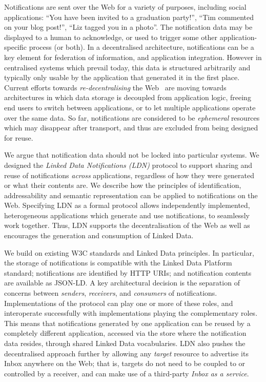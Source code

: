 \documentclass[a4paper]{llncs}
\begin{document}
\par Notifications are sent over the Web for a variety of purposes, including social applications: ``You have been invited to a graduation party!'', ``Tim commented on your blog post!'', ``Liz tagged you in a photo''. The notification data may be displayed to a human to acknowledge, or used to trigger some other application-specific process (or both). In a decentralised architecture, notifications can be a key element for federation of information, and application integration. However in centralised systems which prevail today, this data is structured arbitrarily and typically only usable by the application that generated it in the first place. Current efforts towards {\em re-decentralising} the Web~\cite{ref-1,ref-2,ref-3} are moving towards architectures in which data storage is decoupled from application logic, freeing end users to switch between applications, or to let multiple applications operate over the same data. So far, notifications are considered to be {\em ephemeral} resources which may disappear after transport, and thus are excluded from being designed for reuse.


\par We argue that notification data should not be locked into particular systems. We designed the {\em Linked Data Notifications (LDN)} protocol to support sharing and reuse of notifications {\em across} applications, regardless of how they were generated or what their contents are. We describe how the principles of identification, addressability and semantic representation can be applied to notifications on the Web. Specifying LDN as a formal protocol allows independently implemented, heterogeneous applications which generate and use notifications, to seamlessly work together. Thus, LDN supports the decentralisation of the Web as well as encourages the generation and consumption of Linked Data.


\par We build on existing W3C standards and Linked Data principles. In particular, the storage of notifications is compatible with the Linked Data Platform standard; notifications are identified by HTTP URIs; and notification contents are available as JSON-LD. A key architectural decision is the separation of concerns between {\em senders}, {\em receivers}, and {\em consumers} of notifications. Implementations of the protocol can play one or more of these roles, and interoperate successfully with implementations playing the complementary roles. This means that notifications generated by one application can be reused by a completely different application, accessed via the store where the notification data resides, through shared Linked Data vocabularies. LDN also pushes the decentralised approach further by allowing any {\em target} resource to advertise its Inbox anywhere on the Web; that is, targets do not need to be coupled to or controlled by a receiver, and can make use of a third-party {\em Inbox as a service}.
\end{document}
